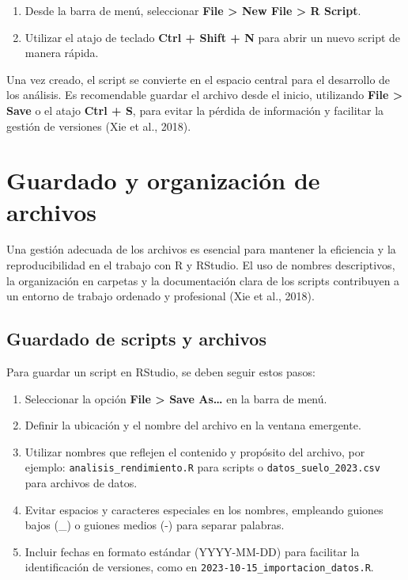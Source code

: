 \documentclass[
  spanish,
  a4paper,
  DIV=11,
  numbers=noendperiod,
  onepage,
  openany]{scrreprt}
\begin{document}
\begin{enumerate}
\def\labelenumi{\arabic{enumi}.}
\item
  Desde la barra de menú, seleccionar \textbf{File \textgreater{} New
  File \textgreater{} R Script}.
\item
  Utilizar el atajo de teclado \textbf{Ctrl + Shift + N} para abrir un
  nuevo script de manera rápida.
\end{enumerate}

Una vez creado, el script se convierte en el espacio central para el
desarrollo de los análisis. Es recomendable guardar el archivo desde el
inicio, utilizando \textbf{File \textgreater{} Save} o el atajo
\textbf{Ctrl + S}, para evitar la pérdida de información y facilitar la
gestión de versiones (Xie et al., 2018).

\section{Guardado y organización de
archivos}\label{guardado-y-organizaciuxf3n-de-archivos}

Una gestión adecuada de los archivos es esencial para mantener la
eficiencia y la reproducibilidad en el trabajo con R y RStudio. El uso
de nombres descriptivos, la organización en carpetas y la documentación
clara de los scripts contribuyen a un entorno de trabajo ordenado y
profesional (Xie et al., 2018).

\subsection{Guardado de scripts y
archivos}\label{guardado-de-scripts-y-archivos}

Para guardar un script en RStudio, se deben seguir estos pasos:

\begin{enumerate}
\def\labelenumi{\arabic{enumi}.}
\item
  Seleccionar la opción \textbf{File \textgreater{} Save As\ldots{}} en
  la barra de menú.
\item
  Definir la ubicación y el nombre del archivo en la ventana emergente.
\item
  Utilizar nombres que reflejen el contenido y propósito del archivo,
  por ejemplo: \texttt{analisis\_rendimiento.R} para scripts o
  \texttt{datos\_suelo\_2023.csv} para archivos de datos.
\item
  Evitar espacios y caracteres especiales en los nombres, empleando
  guiones bajos (\_) o guiones medios (-) para separar palabras.
\item
  Incluir fechas en formato estándar (YYYY-MM-DD) para facilitar la
  identificación de versiones, como en
  \texttt{2023-10-15\_importacion\_datos.R}.
\end{enumerate}
\end{document}
